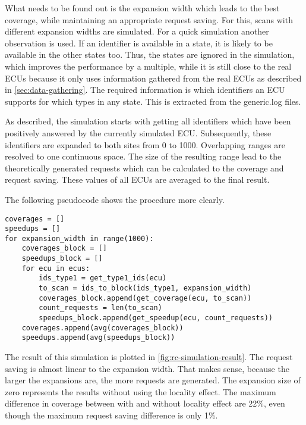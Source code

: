 What needs to be found out is the expansion width which leads to the best coverage, while maintaining an appropriate request saving.
For this, scans with different expansion widths are simulated. For a quick simulation another observation is used. If an identifier is available in a state, it is likely to be available in the other states too. Thus, the states are ignored in the simulation, which improves the performance by a multiple, while it is still close to the real ECUs because it only uses information gathered from the real ECUs as described in \autoref{sec:data-gathering}. The required information is which identifiers an ECU supports for which types in any state. This is extracted from the generic.log files.

As described, the simulation starts with getting all identifiers which have been positively answered by the currently simulated ECU. Subsequently, these identifiers are expanded to both sites from 0 to 1000. Overlapping ranges are resolved to one continuous space. The size of the resulting range lead to the theoretically generated requests which can be calculated to the coverage and request saving. These values of all ECUs are averaged to the final result.
 
The following pseudocode shows the procedure more clearly.

\begin{samepage}
\begin{verbatim}
coverages = []                                                 
speedups = []                                                  
for expansion_width in range(1000):                             
    coverages_block = []                                       
    speedups_block = []                                        
    for ecu in ecus:                                           
        ids_type1 = get_type1_ids(ecu)                         
        to_scan = ids_to_block(ids_type1, expansion_width)     
        coverages_block.append(get_coverage(ecu, to_scan))     
        count_requests = len(to_scan)                          
        speedups_block.append(get_speedup(ecu, count_requests))
    coverages.append(avg(coverages_block))                     
    speedups.append(avg(speedups_block))                       
\end{verbatim}
\end{samepage}

The result of this simulation is plotted in \autoref{fig:rc-simulation-result}. The request saving is almost linear to the expansion width. That makes sense, because the larger the expansions are, the more requests are generated. The expansion size of zero represents the results without using the locality effect. The maximum difference in coverage between with and without locality effect are 22\%, even though the maximum request saving difference is only 1\%.

